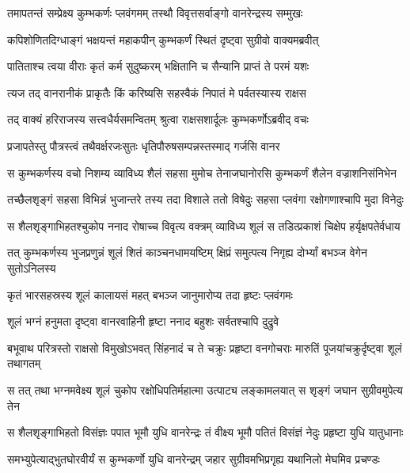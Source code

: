 \twolineshloka
{तमापतन्तं सम्प्रेक्ष्य कुम्भकर्णः प्लवंगमम्}
{तस्थौ विवृत्तसर्वाङ्गो वानरेन्द्रस्य सम्मुखः} %

\twolineshloka
{कपिशोणितदिग्धाङ्गं भक्षयन्तं महाकपीन्}
{कुम्भकर्णं स्थितं दृष्ट्वा सुग्रीवो वाक्यमब्रवीत्} %

\twolineshloka
{पातिताश्च त्वया वीराः कृतं कर्म सुदुष्करम्}
{भक्षितानि च सैन्यानि प्राप्तं ते परमं यशः} %

\twolineshloka
{त्यज तद् वानरानीकं प्राकृतैः किं करिष्यसि}
{सहस्वैकं निपातं मे पर्वतस्यास्य राक्षस} %

\twolineshloka
{तद् वाक्यं हरिराजस्य सत्त्वधैर्यसमन्वितम्}
{श्रुत्वा राक्षसशार्दूलः कुम्भकर्णोऽब्रवीद् वचः} %

\twolineshloka
{प्रजापतेस्तु पौत्रस्त्वं तथैवर्क्षरजःसुतः}
{धृतिपौरुषसम्पन्नस्तस्माद् गर्जसि वानर} %

\twolineshloka
{स कुम्भकर्णस्य वचो निशम्य व्याविध्य शैलं सहसा मुमोच}
{तेनाजघानोरसि कुम्भकर्णं शैलेन वज्राशनिसंनिभेन} %

\twolineshloka
{तच्छैलशृङ्गं सहसा विभिन्नं भुजान्तरे तस्य तदा विशाले}
{ततो विषेदुः सहसा प्लवंगा रक्षोगणाश्चापि मुदा विनेदुः} %

\twolineshloka
{स शैलशृङ्गाभिहतश्चुकोप ननाद रोषाच्च विवृत्य वक्त्रम्}
{व्याविध्य शूलं स तडित्प्रकाशं चिक्षेप हर्यृक्षपतेर्वधाय} %

\twolineshloka
{तत् कुम्भकर्णस्य भुजप्रणुन्नं शूलं शितं काञ्चनधामयष्टिम्}
{क्षिप्रं समुत्पत्य निगृह्य दोर्भ्यां बभञ्ज वेगेन सुतोऽनिलस्य} %

\twolineshloka
{कृतं भारसहस्रस्य शूलं कालायसं महत्}
{बभञ्ज जानुमारोप्य तदा हृष्टः प्लवंगमः} %

\twolineshloka
{शूलं भग्नं हनुमता दृष्ट्वा वानरवाहिनी}
{हृष्टा ननाद बहुशः सर्वतश्चापि दुद्रुवे} %

\threelineshloka
{बभूवाथ परित्रस्तो राक्षसो विमुखोऽभवत्}
{सिंहनादं च ते चक्रुः प्रहृष्टा वनगोचराः}
{मारुतिं पूजयांचक्रुर्दृष्ट्वा शूलं तथागतम्} %

\twolineshloka
{स तत् तथा भग्नमवेक्ष्य शूलं चुकोप रक्षोधिपतिर्महात्मा}
{उत्पाट्य लङ्कामलयात् स शृङ्गं जघान सुग्रीवमुपेत्य तेन} %

\twolineshloka
{स शैलशृङ्गाभिहतो विसंज्ञः पपात भूमौ युधि वानरेन्द्रः}
{तं वीक्ष्य भूमौ पतितं विसंज्ञं नेदुः प्रहृष्टा युधि यातुधानाः} %

\twolineshloka
{समभ्युपेत्याद्भुतघोरवीर्यं स कुम्भकर्णो युधि वानरेन्द्रम्}
{जहार सुग्रीवमभिप्रगृह्य यथानिलो मेघमिव प्रचण्डः} %

